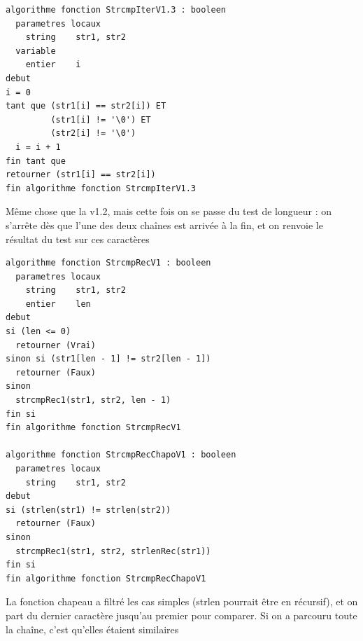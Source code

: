 \documentclass[11pt,a4paper]{article}
\begin{document}
\begin{table}[ht!]
  \centering
\begin{lstlisting}[style=algorithmique]
algorithme fonction StrcmpIterV1.3 : booleen
  parametres locaux
    string    str1, str2
  variable
    entier    i
debut
i = 0
tant que (str1[i] == str2[i]) ET
         (str1[i] != '\0') ET
         (str2[i] != '\0')
  i = i + 1
fin tant que
retourner (str1[i] == str2[i])
fin algorithme fonction StrcmpIterV1.3 \end{lstlisting}
  \caption{Même chose que la v1.2, mais cette fois on se passe du test de longueur : on s'arrête dès que l'une des deux chaînes est arrivée à la fin, et on renvoie le résultat du test sur ces caractères}
\end{table}


\clearpage

\vfillFirst

\begin{table}[ht!]
  \centering
\begin{lstlisting}[style=algorithmique]
algorithme fonction StrcmpRecV1 : booleen
  parametres locaux
    string    str1, str2
    entier    len
debut
si (len <= 0)
  retourner (Vrai)
sinon si (str1[len - 1] != str2[len - 1])
  retourner (Faux)
sinon
  strcmpRec1(str1, str2, len - 1)
fin si
fin algorithme fonction StrcmpRecV1

algorithme fonction StrcmpRecChapoV1 : booleen
  parametres locaux
    string    str1, str2
debut
si (strlen(str1) != strlen(str2))
  retourner (Faux)
sinon
  strcmpRec1(str1, str2, strlenRec(str1))
fin si
fin algorithme fonction StrcmpRecChapoV1 \end{lstlisting}
  \caption{La fonction chapeau a filtré les cas simples (strlen pourrait être en récursif), et on part du dernier caractère jusqu'au premier pour comparer. Si on a parcouru toute la chaîne, c'est qu'elles étaient similaires}
\end{table}


\vfillLast

\newpage
\end{document}
